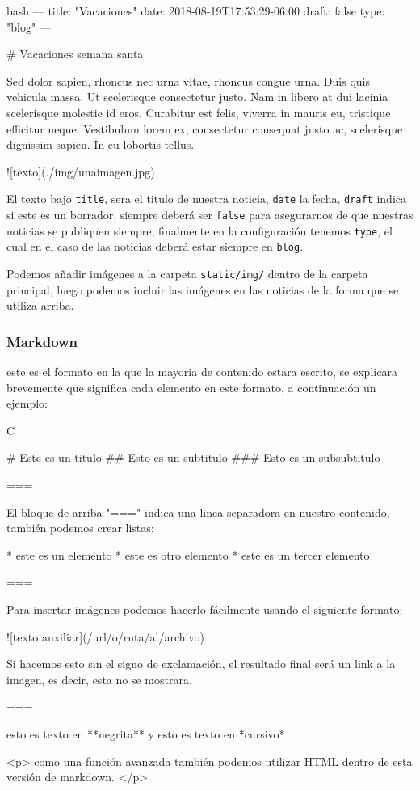 \begin{codeblock}{bash}
---
title: "Vacaciones"
date: 2018-08-19T17:53:29-06:00
draft: false
type: "blog"
---

# Vacaciones semana santa

Sed dolor sapien, rhoncus nec urna vitae, rhoncus congue urna. 
Duis quis vehicula massa. Ut scelerisque consectetur justo. 
Nam in libero at dui lacinia scelerisque molestie id eros. 
Curabitur est felis, viverra in mauris eu, tristique efficitur 
neque. Vestibulum lorem ex, consectetur consequat justo ac, scelerisque 
dignissim sapien. In eu lobortis tellus. 

![texto](./img/unaimagen.jpg)
\end{codeblock}

El texto bajo \texttt{title}, sera el titulo de nuestra noticia, \texttt{date} la fecha, \texttt{draft} indica si este es un borrador, siempre deberá ser \texttt{false} para asegurarnos de que nuestras noticias se publiquen siempre, finalmente en la configuración tenemos \texttt{type}, el cual en el caso de las noticias deberá estar siempre en \texttt{blog}.

Podemos añadir imágenes a la carpeta \texttt{static/img/} dentro de la carpeta principal, luego podemos incluir las imágenes en las noticias de la forma que se utiliza arriba.

\subsubsection{Markdown}

este es el formato en la que la mayoria de contenido estara escrito, se
explicara brevemente que significa cada elemento en este formato, a
continuación un ejemplo:

\begin{codeblock}{C}

# Este es un titulo
## Esto es un subtitulo
### Esto es un subsubtitulo

===

El bloque de arriba "===" indica una linea separadora en nuestro 
contenido, también podemos crear listas:

* este es un elemento
* este es otro elemento
* este es un tercer elemento

===

Para insertar imágenes podemos hacerlo fácilmente
usando el siguiente formato:

![texto auxiliar](/url/o/ruta/al/archivo)

Si hacemos esto sin el signo de exclamación,
el resultado final será un link a la imagen,
es decir, esta no se mostrara.

===

esto es texto en **negrita** y esto es texto en *cursivo*

<p>
  como una función avanzada también podemos utilizar 
  HTML dentro de esta versión de markdown.
</p>
\end{codeblock}

